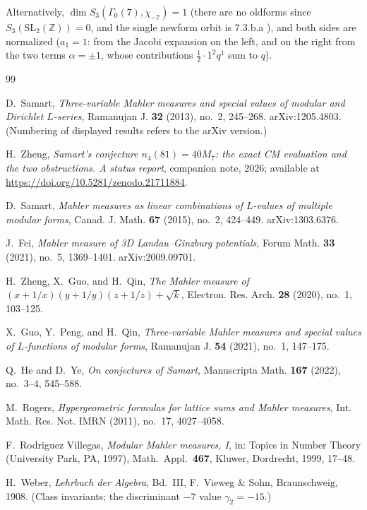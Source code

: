 \documentclass[11pt]{article}
\theoremstyle{definition}
\theoremstyle{remark}
\newcommand{\Zz}{\mathbb{Z}}
\begin{document}
Alternatively, $\dim S_3(\Gamma_0(7),\chi_{-7})=1$ (there are no oldforms
since $S_3(\mathrm{SL}_2(\Zz))=0$, and the single newform orbit is
\textsf{7.3.b.a} \cite{LMFDB}), and both sides are normalized ($a_1=1$:
from the Jacobi expansion on the left, and on the right from the two
terms $\alpha=\pm1$, whose contributions $\tfrac12\cdot 1^2 q^1$ sum to
$q$).

\begin{thebibliography}{99}

D.~Samart,
\emph{Three-variable Mahler measures and special values of modular and
Dirichlet $L$-series},
Ramanujan J. \textbf{32} (2013), no.~2, 245--268.
arXiv:1205.4803. (Numbering of displayed results refers to the arXiv
version.)

H.~Zheng,
\emph{Samart's conjecture $n_4(81)=40M_7$: the exact CM evaluation and
the two obstructions. A status report},
companion note, 2026; available at
\url{https://doi.org/10.5281/zenodo.21711884}.

D.~Samart,
\emph{Mahler measures as linear combinations of $L$-values of multiple
modular forms},
Canad. J. Math. \textbf{67} (2015), no.~2, 424--449.
arXiv:1303.6376.

J.~Fei,
\emph{Mahler measure of 3D Landau--Ginzburg potentials},
Forum Math. \textbf{33} (2021), no.~5, 1369--1401.
arXiv:2009.09701.

H.~Zheng, X.~Guo, and H.~Qin,
\emph{The Mahler measure of $(x+1/x)(y+1/y)(z+1/z)+\sqrt{k}$},
Electron. Res. Arch. \textbf{28} (2020), no.~1, 103--125.

X.~Guo, Y.~Peng, and H.~Qin,
\emph{Three-variable Mahler measures and special values of $L$-functions
of modular forms},
Ramanujan J. \textbf{54} (2021), no.~1, 147--175.

Q.~He and D.~Ye,
\emph{On conjectures of Samart},
Manuscripta Math. \textbf{167} (2022), no.~3--4, 545--588.

M.~Rogers,
\emph{Hypergeometric formulas for lattice sums and Mahler measures},
Int. Math. Res. Not. IMRN (2011), no.~17, 4027--4058.

F.~Rodriguez Villegas,
\emph{Modular Mahler measures, I},
in: Topics in Number Theory (University Park, PA, 1997),
Math.\ Appl.\ \textbf{467}, Kluwer, Dordrecht, 1999, 17--48.

H.~Weber,
\emph{Lehrbuch der Algebra}, Bd.~III, F.~Vieweg \& Sohn, Braunschweig,
1908. (Class invariants; the discriminant $-7$ value $\gamma_2=-15$.)


\end{thebibliography}
\end{document}
